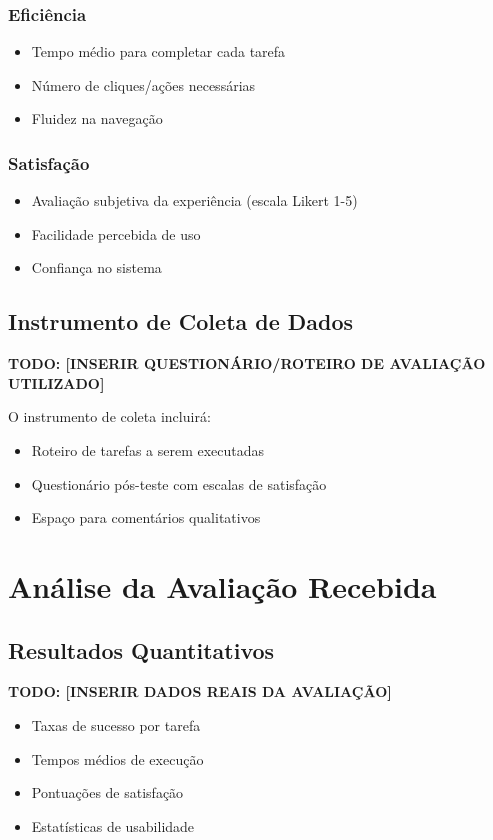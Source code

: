 \documentclass[12pt, a4paper]{report}
\begin{document}
\subsubsection{Eficiência}
\begin{itemize}
    \item Tempo médio para completar cada tarefa
    \item Número de cliques/ações necessárias
    \item Fluidez na navegação
\end{itemize}

\subsubsection{Satisfação}
\begin{itemize}
    \item Avaliação subjetiva da experiência (escala Likert 1-5)
    \item Facilidade percebida de uso
    \item Confiança no sistema
\end{itemize}

\subsection{Instrumento de Coleta de Dados}

\textbf{TODO: [INSERIR QUESTIONÁRIO/ROTEIRO DE AVALIAÇÃO UTILIZADO]}

O instrumento de coleta incluirá:
\begin{itemize}
    \item Roteiro de tarefas a serem executadas
    \item Questionário pós-teste com escalas de satisfação
    \item Espaço para comentários qualitativos
\end{itemize}

\section{Análise da Avaliação Recebida}

\subsection{Resultados Quantitativos}

\textbf{TODO: [INSERIR DADOS REAIS DA AVALIAÇÃO]}
\begin{itemize}
    \item Taxas de sucesso por tarefa
    \item Tempos médios de execução
    \item Pontuações de satisfação
    \item Estatísticas de usabilidade
\end{itemize}
\end{document}
